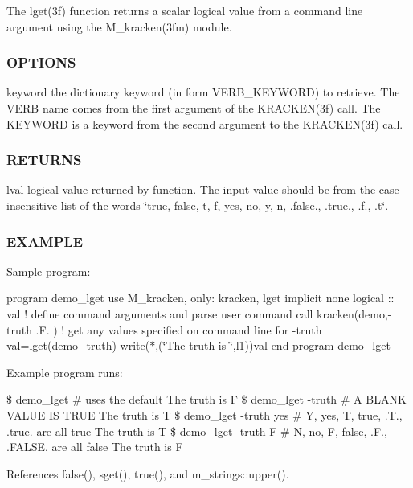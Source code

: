 The lget(3f) function returns a scalar logical value from a command line argument using the M\+\_\+kracken(3fm) module.

\subsubsection*{O\+P\+T\+I\+O\+NS}

keyword the dictionary keyword (in form V\+E\+R\+B\+\_\+\+K\+E\+Y\+W\+O\+RD) to retrieve. The V\+E\+RB name comes from the first argument of the K\+R\+A\+C\+K\+E\+N(3f) call. The K\+E\+Y\+W\+O\+RD is a keyword from the second argument to the K\+R\+A\+C\+K\+E\+N(3f) call.

\subsubsection*{R\+E\+T\+U\+R\+NS}

lval logical value returned by function. The input value should be from the case-\/insensitive list of the words \char`\"{}true, false,
                t, f, yes, no, y, n, .\+false., .\+true., .\+f., .\+t\char`\"{}.

\subsubsection*{E\+X\+A\+M\+P\+LE}

Sample program\+:

program demo\+\_\+lget use M\+\_\+kracken, only\+: kracken, lget implicit none logical \+:\+: val ! define command arguments and parse user command call kracken(\textquotesingle{}demo\textquotesingle{},\textquotesingle{}-\/truth .F.\textquotesingle{} ) ! get any values specified on command line for -\/truth val=lget(\textquotesingle{}demo\+\_\+truth\textquotesingle{}) write($\ast$,\textquotesingle{}(\char`\"{}\+The truth is \char`\"{},l1)\textquotesingle{})val end program demo\+\_\+lget

Example program runs\+:

\$ demo\+\_\+lget \# uses the default The truth is F \$ demo\+\_\+lget -\/truth \# A B\+L\+A\+NK V\+A\+L\+UE IS T\+R\+UE The truth is T \$ demo\+\_\+lget -\/truth yes \# Y, yes, T, true, .T., .true. are all true The truth is T \$ demo\+\_\+lget -\/truth F \# N, no, F, false, .F., .F\+A\+L\+SE. are all false The truth is F 

References false(), sget(), true(), and m\+\_\+strings\+::upper().

\mbox{\label{namespacem__kracken_afb3f3b45b78625758818ea9bef463fd9}} 
